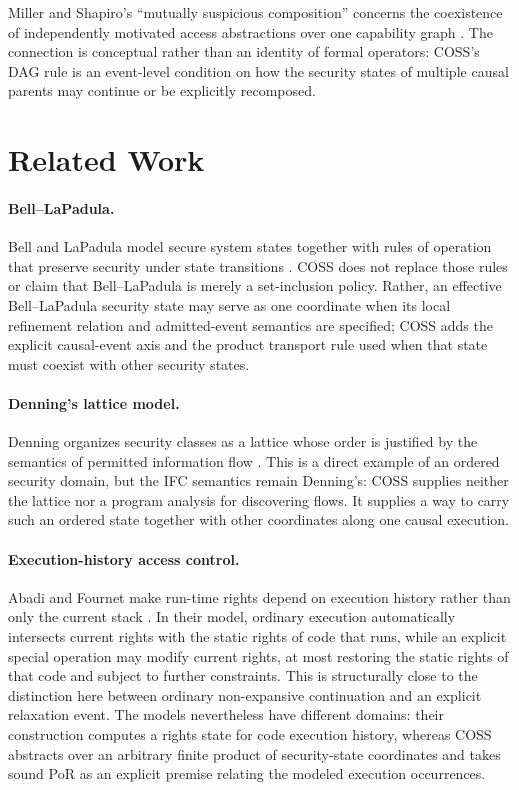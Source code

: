 \documentclass[10pt,twocolumn]{article}
\newcommand{\Model}{\textnormal{\textsc{COSS}}\xspace}
\begin{document}
Miller and Shapiro's ``mutually suspicious composition'' concerns the
coexistence of independently motivated access abstractions over one capability
graph \cite{miller_shapiro2003}. The connection is conceptual rather than an
identity of formal operators: \Model's DAG rule is an event-level condition on
how the security states of multiple causal parents may continue or be
explicitly recomposed.

\section{Related Work}

\paragraph{Bell--LaPadula.}
Bell and LaPadula model secure system states together with rules of operation
that preserve security under state transitions \cite{bell_lapadula1973model}.
\Model does not replace those rules or claim that Bell--LaPadula is merely a
set-inclusion policy.  Rather, an effective Bell--LaPadula security state may
serve as one coordinate when its local refinement relation and admitted-event
semantics are specified; \Model adds the explicit causal-event axis and the
product transport rule used when that state must coexist with other security
states.

\paragraph{Denning's lattice model.}
Denning organizes security classes as a lattice whose order is justified by the
semantics of permitted information flow \cite{denning1976}.  This is a direct
example of an ordered security domain, but the IFC semantics remain Denning's:
\Model supplies neither the lattice nor a program analysis for discovering
flows.  It supplies a way to carry such an ordered state together with other
coordinates along one causal execution.

\paragraph{Execution-history access control.}
Abadi and Fournet make run-time rights depend on execution history rather than
only the current stack \cite{abadi_fournet2003}.  In their model, ordinary
execution automatically intersects current rights with the static rights of
code that runs, while an explicit special operation may modify current rights,
at most restoring the static rights of that code and subject to further
constraints.  This is structurally close to the distinction here
between ordinary non-expansive continuation and an explicit relaxation event.
The models nevertheless have different domains: their construction computes a
rights state for code execution history, whereas \Model abstracts over an
arbitrary finite product of security-state coordinates and takes sound PoR as
an explicit premise relating the modeled execution occurrences.
\end{document}

